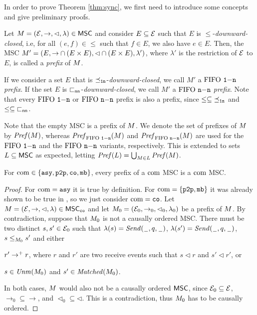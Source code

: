 In order to prove Theorem \ref{thm:sync}, we first need to introduce some concepts and give preliminary proofs. 

\begin{definition}[Prefix]
	Let $M = (\mathcal{E},\to,\lhd,\lambda) \in \mathsf{MSC}$ and consider
	$E \subseteq \mathcal{E}$ such that $E$ is ${\le}$-\emph{downward-closed}, i.e,
	for all $(e,f) \in {\le}$ such that $f \in E$, we also have $e \in E$.
	Then, the MSC $M' = (E,{\to} \cap (E \times E),{\lhd} \cap (E \times E),\lambda')$,
	where $\lambda'$ is the restriction of $\mathcal{E}$ to $E$, is called a \emph{prefix}
	of $M$. 	
\end{definition}

If we consider a set $E$ that is ${\preceq_{\mathtt{1n}}}$-\emph{downward-closed}, we call $M'$ a \emph{$\text{FIFO } \mathtt{1\mathsf{-}n}$ prefix}.
If the set $E$ is ${\sqsubset_{\mathsf{nn}}}$-\emph{downward-closed}, we call $M'$ a \emph{$\text{FIFO } \mathtt{n\mathsf{-}n}$ prefix}. Note that every $\text{FIFO } \mathtt{1\mathsf{-}n}$ or $\text{FIFO } \mathtt{n\mathsf{-}n}$ prefix is also a prefix, since $\le \subseteq {\preceq_{\ensuremath{\mathtt{1n}}}}$ and $\le \subseteq {\sqsubset_{\mathsf{nn}}}$.

Note that the empty MSC is a prefix of $M$.
We denote the set of prefixes of $M$ by $\mathit{Pref}(M)$, whereas $\mathit{Pref}_{\text{FIFO } \mathtt{1\mathsf{-}n}}(M)$ and $\mathit{Pref}_{\text{FIFO } \mathtt{n\mathsf{-}n}}(M)$ are used for the $\text{FIFO } \mathtt{1\mathsf{-}n}$ and the $\text{FIFO } \mathtt{n\mathsf{-}n}$ variants, respectively.
This is extended to sets $L \subseteq \mathsf{MSC}$ as expected, letting
$\mathit{Pref}(L) = \bigcup_{M \in L} \mathit{Pref}(M)$.

\begin{proposition}
	\label{prop:prefixes}
	For $\textup{com} \in \{\mathtt{asy}, \mathtt{p2p}, \mathtt{co}, \mathtt{mb}\}$, every prefix of a $\textup{com}$ MSC is a $\textup{com}$ MSC.
\end{proposition}
\begin{proof}
    For $\textup{com} = \mathtt{asy}$ it is true by definition. For $\textup{com} = \{\mathtt{p2p}, \mathtt{mb}\}$ it was already shown to be true in \cite{BolligGFLLS21}, so we just consider $\textup{com} = \mathtt{co}$. Let $M = (\mathcal{E}, \to, \lhd, \lambda) \in \mathsf{MSC}_{\mathtt{co}}$ and let $M_0 =
    (\mathcal{E}_0, \to_0, \lhd_0, \lambda_0)$ be a prefix of $M$. By contradiction, suppose that $M_0$ is not a	causally ordered MSC. There must be two distinct $s,s' \in \mathcal{E}_0$ such that $\lambda(s)={\mathit{Send}(\hspace{0.1em}\underline{\hspace{0.5em}}\hspace{0.1em},q,\hspace{0.1em}\underline{\hspace{0.5em}}\hspace{0.1em})}$, $\lambda(s')={\mathit{Send}(\hspace{0.1em}\underline{\hspace{0.5em}}\hspace{0.1em},q,\hspace{0.1em}\underline{\hspace{0.5em}}\hspace{0.1em})}$, $s \le_{M_0} s'$ and either
    \begin{enumerate*}[label={(\roman*)}]
        \item $r' \to^+ r$, where $r$ and $r'$ are two receive events such that $s \lhd r$ and $s' \lhd r'$, or
        \item $s \in \mathit{Unm}(M_0)$ and $s' \in \mathit{Matched}(M_0)$.
    \end{enumerate*}
    In both cases, $M$ would also not be a causally ordered $\mathsf{MSC}$, since $\mathcal{E}_0 \subseteq \mathcal{E}$, ${\rightarrow_0} \subseteq {\rightarrow}$, and ${\lhd_0} \subseteq {\lhd}$. This is a contradiction, thus $M_0$ has to be causally ordered.
\end{proof}

